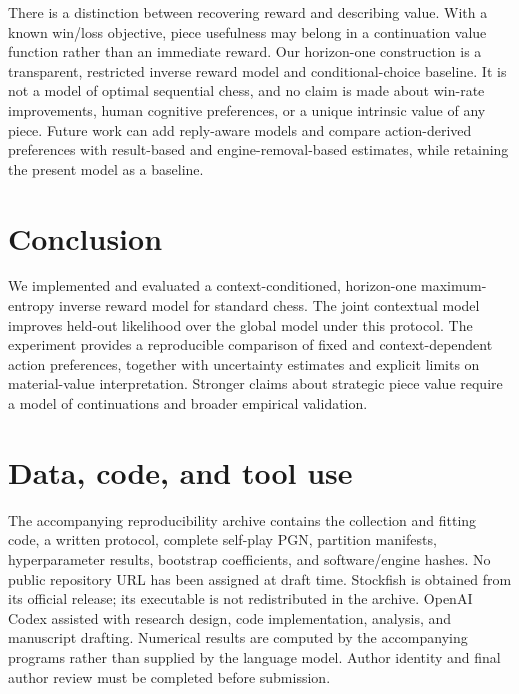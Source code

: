 \documentclass[11pt]{article}
\begin{document}
There is a distinction between recovering reward and describing value. With a known win/loss objective, piece usefulness may belong in a continuation value function rather than an immediate reward. Our horizon-one construction is a transparent, restricted inverse reward model and conditional-choice baseline. It is not a model of optimal sequential chess, and no claim is made about win-rate improvements, human cognitive preferences, or a unique intrinsic value of any piece. Future work can add reply-aware models and compare action-derived preferences with result-based and engine-removal-based estimates, while retaining the present model as a baseline.

\section{Conclusion}
We implemented and evaluated a context-conditioned, horizon-one maximum-entropy inverse reward model for standard chess. The joint contextual model improves held-out likelihood over the global model under this protocol. The experiment provides a reproducible comparison of fixed and context-dependent action preferences, together with uncertainty estimates and explicit limits on material-value interpretation. Stronger claims about strategic piece value require a model of continuations and broader empirical validation.

\section*{Data, code, and tool use}
The accompanying reproducibility archive contains the collection and fitting code, a written protocol, complete self-play PGN, partition manifests, hyperparameter results, bootstrap coefficients, and software/engine hashes. No public repository URL has been assigned at draft time. Stockfish is obtained from its official release; its executable is not redistributed in the archive. OpenAI Codex assisted with research design, code implementation, analysis, and manuscript drafting. Numerical results are computed by the accompanying programs rather than supplied by the language model. Author identity and final author review must be completed before submission.

\appendix
\end{document}
